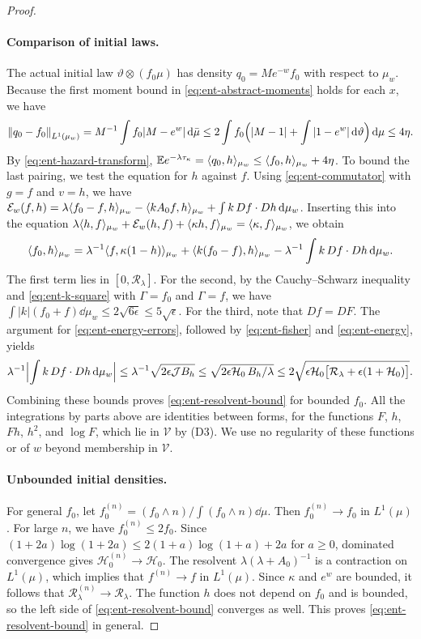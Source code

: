 \begin{proof}
\paragraph{Comparison of initial laws.}
The actual initial law $\vartheta\otimes(f_0\mu)$ has density
$q_0=Me^{-w}f_0$ with respect to $\mu_w$. Because the first moment bound in
\eqref{eq:ent-abstract-moments} holds for each $x$, we have
\begin{equation}\label{eq:ent-initial}
 \left\lVert q_0-f_0\right\rVert_{L^1(\mu_w)}=M^{-1}\int f_0|M-e^w|\,\mathrm d\bar\mu
 \le2\int f_0\Bigl(|M-1|+\int|1-e^w|\,\mathrm d\vartheta\Bigr)\,\mathrm d\mu\le4\eta .
\end{equation}
By \eqref{eq:ent-hazard-transform}, $\mathbb E e^{-\lambda\tau_\kappa}
=\langle q_0,h\rangle_{\mu_w}\le\langle f_0,h\rangle_{\mu_w}+4\eta$. To bound the last pairing,
we test the equation for $h$ against $f$. Using \eqref{eq:ent-commutator} with $g=f$ and $v=h$, we have $\mathcal E_w(f,h)=\lambda\langle f_0-f,h\rangle_{\mu_w}
-\langle kA_0f,h\rangle_{\mu_w}+\int k\,Df\cdot Dh\,\mathrm d\mu_w$. Inserting this
into the equation
$\lambda\langle h,f\rangle_{\mu_w}+\mathcal E_w(h,f)+\langle\kappa h,f\rangle_{\mu_w}
=\langle\kappa,f\rangle_{\mu_w}$, we obtain
\begin{equation}\label{eq:ent-source}
 \langle f_0,h\rangle_{\mu_w}=\lambda^{-1}\langle f,\kappa(1-h)\rangle_{\mu_w}
 +\langle k(f_0-f),h\rangle_{\mu_w}-\lambda^{-1}\int k\,Df\cdot Dh\,\mathrm d\mu_w .
\end{equation}
The first term lies in $[0,\mathcal R_\lambda]$. For the second, by
the Cauchy--Schwarz inequality and \eqref{eq:ent-k-square} with $\Gamma=f_0$
and $\Gamma=f$, we have
$\int|k|(f_0+f)\dd\mu_w\le2\sqrt{6\epsilon}\le5\sqrt\epsilon$.
For the third, note that $Df=DF$. The argument for
\eqref{eq:ent-energy-errors}, followed by \eqref{eq:ent-fisher} and
\eqref{eq:ent-energy}, yields
\[
 \lambda^{-1}\Bigl|\int k\,Df\cdot Dh\,\mathrm d\mu_w\Bigr|
 \le\lambda^{-1}\sqrt{2\epsilon\mathcal JB_h}
 \le\sqrt{2\epsilon\mathcal H_0\,B_h/\lambda}
 \le2\sqrt{\epsilon\mathcal H_0\bigl[\mathcal R_\lambda
   +\epsilon(1+\mathcal H_0)\bigr]}.
\]
Combining these bounds proves \eqref{eq:ent-resolvent-bound} for bounded
$f_0$. All the integrations by parts above are identities between forms, for
the functions $F$, $h$, $Fh$, $h^2$, and $\log F$, which lie in $\mathcal V$
by (D3). We use no regularity of these functions or of $w$ beyond
membership in $\mathcal V$.

\paragraph{Unbounded initial densities.}
For general $f_0$, let $f_0^{(n)}=(f_0\wedge n)/\int(f_0\wedge n)\dd\mu$.
Then $f_0^{(n)}\to f_0$ in $L^1(\mu)$. For large $n$, we have
$f_0^{(n)}\le2f_0$. Since $(1+2a)\log(1+2a)\le2(1+a)\log(1+a)+2a$ for
$a\ge0$, dominated convergence gives $\mathcal H_0^{(n)}\to\mathcal H_0$. The
resolvent $\lambda(\lambda+A_0)^{-1}$ is a contraction on $L^1(\mu)$, which implies that $f^{(n)}\to f$
in $L^1(\mu)$. Since $\kappa$ and $e^w$ are bounded, it follows that
$\mathcal R_\lambda^{(n)}\to\mathcal R_\lambda$. The function $h$ does not depend on $f_0$ and is bounded,
so the left side of \eqref{eq:ent-resolvent-bound} converges as well. This
proves \eqref{eq:ent-resolvent-bound} in general.


\end{proof}
